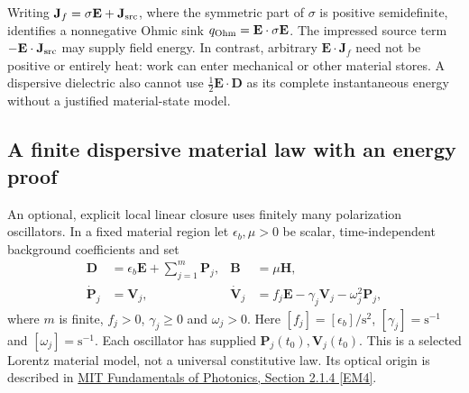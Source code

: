 Writing $\mathbf J_f=\sigma\mathbf E+\mathbf J_{\rm src}$, where the symmetric
part of $\sigma$ is positive semidefinite, identifies a nonnegative Ohmic sink
$q_{\rm Ohm}=\mathbf E\cdot\sigma\mathbf E$. The impressed source term
$-\mathbf E\cdot\mathbf J_{\rm src}$ may supply field energy. In contrast,
arbitrary $\mathbf E\cdot\mathbf J_f$ need not be positive or entirely heat:
work can enter mechanical or other material stores. A dispersive dielectric
also cannot use $\tfrac12\mathbf E\cdot\mathbf D$ as its complete instantaneous
energy without a justified material-state model.

\subsection{A finite dispersive material law with an energy proof}
\label{sec:r13-em-lorentz}

An optional, explicit local linear closure uses finitely many polarization
oscillators. In a fixed material region let $\epsilon_b,\mu>0$ be scalar,
time-independent background coefficients and set
\begin{align}
 \mathbf D&=\epsilon_b\mathbf E+\sum_{j=1}^{m}\mathbf P_j,
 &\mathbf B&=\mu\mathbf H,\nonumber\\
 \dot{\mathbf P}_j&=\mathbf V_j,
 &\dot{\mathbf V}_j&=f_j\mathbf E-\gamma_j\mathbf V_j-
                              \omega_j^2\mathbf P_j,
 \label{eq:r13-em-lorentz}
\end{align}
where $m$ is finite, $f_j>0$, $\gamma_j\ge0$ and $\omega_j>0$.
Here $[f_j]=[\epsilon_b]/\mathrm{s^2}$, $[\gamma_j]=\mathrm{s^{-1}}$ and
$[\omega_j]=\mathrm{s^{-1}}$. Each oscillator has supplied
$\mathbf P_j(t_0),\mathbf V_j(t_0)$. This is a selected Lorentz material model,
not a universal constitutive law. Its optical origin is described in
\href{https://www.ocw.mit.edu/courses/6-974-fundamentals-of-photonics-quantum-electronics-spring-2006/8e54d1625e9e71eb5b4e4998e6967e4e_chapter2.pdf}{MIT Fundamentals of Photonics, Section 2.1.4 [EM4]}.

